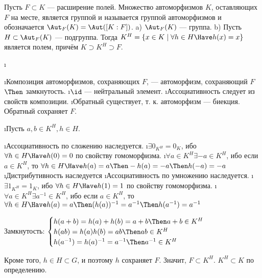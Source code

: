 \begin{problem}
Пусть $F \subset K$ — расширение полей. Множество автоморфизмов $K$, оставляющих $F$ на месте, является группой и называется группой автоморфизмов и обозначается $\Aut_F(K) = \Aut([K : F])$.
a) $\Aut_F(K)$ — группа.
b) Пусть $H \subset \Aut_F(K)$ --- подгруппа. Тогда $K^H = \{x \in K \mid \forall h \in H \Have h(x) = x\}$ является полем, причём $K \supset K^H \supset F$.
\end{problem}
\begin{solution}
\begin{enumerate}
\def\labelenumi{\alph{enumi})}
\i
	\begin{itemize}
	\i Композиция автоморфизмов, сохраняющих \(F\), --- автоморфизм, сохраняющий \(F\) \(\Then\) замкнутость.
	\i \(\id\) --- нейтральный элемент.
	\i Ассоциативность следует из свойств композиции.
	\i Обратный существует, т. к. автоморфизм --- биекция. Обратный сохраняет \(F\).
	\end{itemize}
\i Пусть \(a, b \in K^H, h \in H\). 
	\begin{itemize}
	\i Ассоциативность по сложению наследуется.
	\i $\exists 0_{K^H} = 0_K$, ибо $\forall h \in H \Have h(0)=0$ по свойству гомоморфизма.
	\i $\forall a \in K^H \exists -a \in K^H$, ибо если $a \in K^H$, то $\forall h \in H \Have h(a) = a \Then -h(a) = -a \Then h(-a) = -a$
	\i Дистрибутивность наследуется
	\i Ассоциативность по умножению наследуется.
	\i $\exists 1_{K^H} = 1_K$, ибо $\forall h \in H \Have h(1)=1$ по свойству гомоморфизма.
	\i $\forall a \in K^H \exists a^{-1} \in K^H$, ибо если $a \in K^H$, то $\forall h \in H \Have h(a) = a \Then (h(a))^{-1} = a^{-1} \Then h(a^{-1}) = a^{-1}$
	\end{itemize}
	Замкнутость:
	$\begin{cases}
	h(a + b) = h(a) + h(b) = a + b \Then a + b \in K^H \\
	h(ab) = h(a)h(b) = ab \Then ab \in K^H \\
	h(a^{-1}) = h(a)^{-1} = a^{-1} \Then a^{-1} \in K^H
	\end{cases}$

	Кроме того, \(h \in H \subset G\), и поэтому \(h\) сохраняет \(F\). Значит, \(F \subset K^H\).
	\(K^H \subset K\) по определению.
\end{enumerate}
\end{solution}

